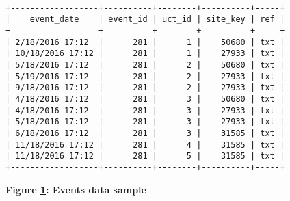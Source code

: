 \begin{figure}[H]
  \centering
  \begin{mdframed}
    \centering
\begin{BVerbatim}

+------------------+----------+--------+----------+-----+
|    event_date    | event_id | uct_id | site_key | ref |
+------------------+----------+--------+----------+-----+
| 2/18/2016 17:12  |      281 |      1 |    50680 | txt |
| 10/18/2016 17:12 |      281 |      1 |    27933 | txt |
| 5/18/2016 17:12  |      281 |      2 |    50680 | txt |
| 5/19/2016 17:12  |      281 |      2 |    27933 | txt |
| 9/18/2016 17:12  |      281 |      2 |    27933 | txt |
| 4/18/2016 17:12  |      281 |      3 |    50680 | txt |
| 4/18/2016 17:12  |      281 |      3 |    27933 | txt |
| 5/18/2016 17:12  |      281 |      3 |    27933 | txt |
| 6/18/2016 17:12  |      281 |      3 |    31585 | txt |
| 11/18/2016 17:12 |      281 |      4 |    31585 | txt |
| 11/18/2016 17:12 |      281 |      5 |    31585 | txt |
+------------------+----------+--------+----------+-----+

\end{BVerbatim}
  \end{mdframed}
  \caption[Events data sample]{\textbf{Figure \ref{fig-sample-events}: Events data sample}}
  \label{fig-sample-events}
\end{figure}
